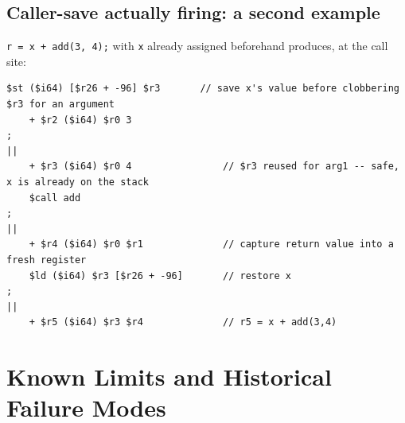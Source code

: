 \documentclass[11pt,a4paper]{article}
\begin{document}
\subsection*{Caller-save actually firing: a second example}
\texttt{r = x + add(3, 4);} with \texttt{x} already assigned beforehand produces, at the
call site:
\begin{lstlisting}[caption={Caller-save in action (excerpt)}]
    $st ($i64) [$r26 + -96] $r3       // save x's value before clobbering $r3 for an argument
    + $r2 ($i64) $r0 3
;
||
    + $r3 ($i64) $r0 4                // $r3 reused for arg1 -- safe, x is already on the stack
    $call add
;
||
    + $r4 ($i64) $r0 $r1              // capture return value into a fresh register
    $ld ($i64) $r3 [$r26 + -96]       // restore x
;
||
    + $r5 ($i64) $r3 $r4              // r5 = x + add(3,4)
\end{lstlisting}

\section{Known Limits and Historical Failure Modes}
\label{sec:limits}
\end{document}

